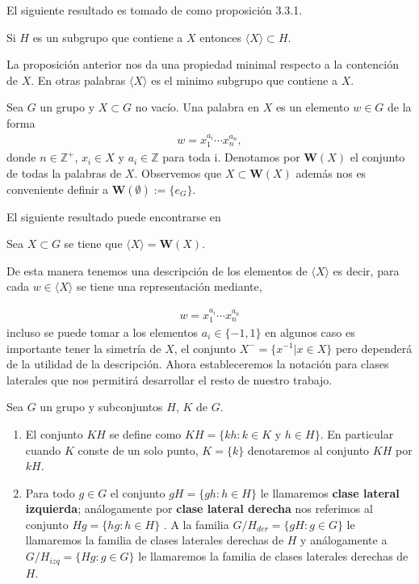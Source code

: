El siguiente resultado es tomado de \cite{alg_i} como proposición 3.3.1.

\begin{pr}
Si $H$ es un subgrupo que contiene a $X$ entonces $\langle X \rangle \subset H$.
\end{pr}
La proposición anterior nos da una propiedad minimal respecto a la contención de $X$. En otras palabras	$\langle X \rangle$ es el minimo subgrupo que contiene a $X$.

\begin{df}
Sea $G$ un  grupo y $X \subset G$ no vacío. Una palabra en $X$ es un elemento $w \in G$ de la forma
\begin{align*}
w=x_1^{a_i} \cdots x_n^{a_n},
\end{align*}
donde $n \in \mathbb{Z}^+$, $x_i \in X$ y $a_i \in \mathbb{Z}$ para toda i. Denotamos por $\mathbf{W}(X)$ el conjunto de todas la palabras de  $X$. Observemos que $X \subset \mathbf{W}(X)$ además nos es conveniente definir a $\mathbf{W}(\emptyset) :=\{e_G\}$.
\end{df}
El siguiente resultado puede encontrarse en %

\begin{te}
Sea $X \subset G$ se tiene que $\langle X \rangle= \mathbf{W}(X)$.
\end{te}
De esta manera tenemos una descripción de los elementos de $\langle X \rangle$ es decir, para cada $w \in \langle X \rangle$ se tiene una representación mediante, 

\begin{align*}
w=x_1^{a_i} \cdots x_n^{a_n}
\end{align*}
incluso se puede tomar a los elementos $a_i \in \{-1,1\}$ en algunos caso es importante tener la simetría de $X$, el conjunto $X^-=\{x^{-1}| x \in X \}$ pero dependerá de la utilidad de la descripción. Ahora estableceremos la notación para clases laterales que nos permitirá desarrollar el resto de nuestro trabajo. 	
	
\begin{df}
Sea $G$ un grupo y subconjuntos $H$, $K$ de $G$.
\begin{enumerate}
		
		\item El conjunto $KH$ se define como  $KH=\{kh: k \in K \text{ y } h \in H \}$. En particular cuando $K$ conste de un solo punto, $K=\{k\}$ denotaremos al conjunto $KH$ por $kH$.	
		
		
		
		\item Para todo $g \in G$ el conjunto $gH=\{gh:h \in H \}$ le llamaremos \textbf{clase lateral izquierda}; análogamente por \textbf{clase lateral derecha} nos referimos al conjunto $Hg=\{hg:h \in H\}$ . A la familia  $G/H_{der}=\{gH:g \in G\}$
le llamaremos la familia de clases laterales derechas de $H$ y análogamente a $G/H_{izq}=\{Hg:g \in G\}$
le llamaremos la familia de clases laterales derechas de $H$. 
	\end{enumerate} 
\end{df}	

